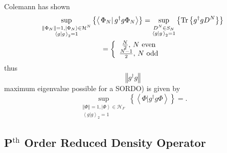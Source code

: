 \documentclass[aps,preprint]{revtex4}%
\begin{document}
Colemann has shown
\begin{gather}
\sup_{\substack{\left\Vert \Phi_{N}\right\Vert =1,\left\vert \Phi
_{N}\right\rangle \in\mathcal{H}^{N}\\\left\langle g\left\vert g\right.
\right\rangle _{2}=1}}\left\{  \left\langle \left.  \Phi_{N}\right\vert
g^{\dagger}g\Phi_{N}\right\rangle \right\}  =\sup_{\substack{D^{N}\in
S_{N}\\\left\langle g\left\vert g\right.  \right\rangle _{2}=1}}\left\{
\operatorname*{Tr}\left\{  g^{\dagger}gD^{N}\right\}  \right\} \nonumber\\
=\left\{
\begin{array}
[c]{c}%
\frac{N}{2},\,N\text{ even}\\
\frac{N-1}{2},\,N\text{ odd}%
\end{array}
\right.
\end{gather}
thus
\begin{equation}
\left\Vert g^{\dagger}g\right\Vert
\end{equation}
maximum eigenvalue possible for a SORDO) is given by
\begin{equation}
\sup_{\substack{\left\Vert \Phi\right\Vert =1,\left\vert \Phi\right\rangle
\in\mathcal{H}_{F}\\\left\langle g\left\vert g\right.  \right\rangle _{2}%
=1}}\left\{  \left\langle \left.  \Phi\right\vert g^{\dagger}g\Phi
\right\rangle \right\}  =.
\end{equation}


\subsection{P$^{\text{th}}$ Order Reduced Density Operator}
\end{document}
